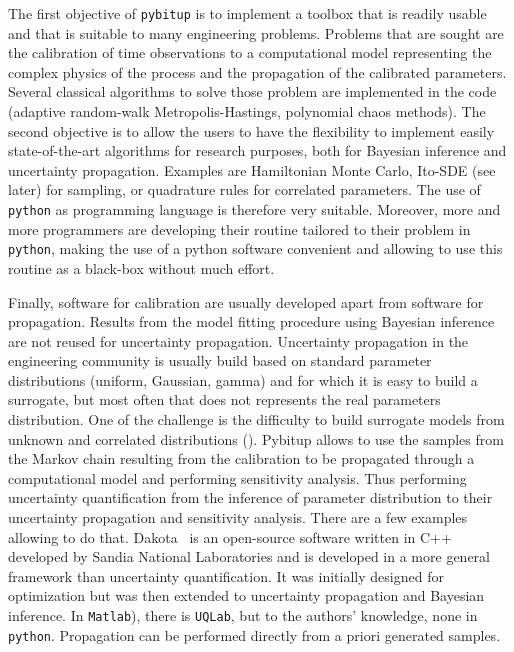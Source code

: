 \documentclass[a4paper,11pt]{article}
\begin{document}
The first objective of \texttt{pybitup} is to implement a toolbox that is readily usable and that is suitable to many engineering problems. Problems that are sought are the calibration of time observations to a computational model representing the complex physics of the process and the propagation of the calibrated parameters. Several classical algorithms to solve those problem are implemented in the code (adaptive random-walk Metropolis-Hastings, polynomial chaos methods). The second objective is to allow the users to have the flexibility to implement easily state-of-the-art algorithms for research purposes, both for Bayesian inference and uncertainty propagation. Examples are Hamiltonian Monte Carlo, Ito-SDE (see later) for sampling, or quadrature rules for correlated parameters. The use of \texttt{python} as programming language is therefore very suitable. Moreover, more and more programmers are developing their routine tailored to their problem in \texttt{python}, making the use of a python software convenient and allowing to use this routine as a black-box without much effort. 

Finally, software for calibration are usually developed apart from software for propagation. Results from the model fitting procedure using  Bayesian inference are not reused for uncertainty propagation. Uncertainty propagation in the engineering community is usually build based on standard parameter distributions (uniform, Gaussian, gamma) and for which it is easy to build a surrogate, but most often that does not represents the real parameters distribution. One of the challenge is the difficulty to build surrogate models from unknown and correlated distributions (\cite{Jakeman_2019}). Pybitup allows to use the samples from the Markov chain resulting from the calibration to be propagated through a computational model and performing sensitivity analysis. Thus performing uncertainty quantification from the inference of parameter distribution to their uncertainty propagation and sensitivity analysis. There are a few examples allowing to do that. Dakota~\cite{dakota_6_10} is an open-source software written in C++ developed by Sandia National Laboratories and is developed in a more general framework than uncertainty quantification. It was initially designed for optimization but was then extended to uncertainty propagation and Bayesian inference. In \texttt{Matlab}), there is \texttt{UQLab}, but to the authors' knowledge, none in \texttt{python}. Propagation can be performed directly from a priori generated samples.  
\end{document}
